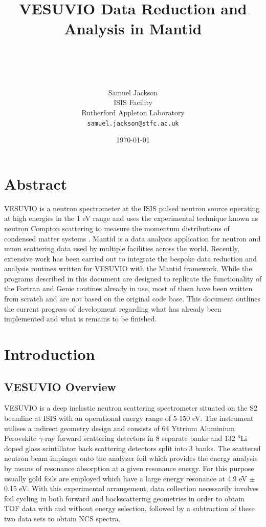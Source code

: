 \documentclass[paper=a4, fontsize=11pt]{scrartcl}	%
\title{ \vspace{-1in} 	\usefont{OT1}{bch}{b}{n}
		\huge \strut VESUVIO Data Reduction and Analysis in Mantid \strut \\
}
\author{ 									\usefont{OT1}{bch}{m}{n}
        Samuel Jackson\\		\usefont{OT1}{bch}{m}{n}
        ISIS Facility\\	\usefont{OT1}{bch}{m}{n}
        Rutherford Appleton Laboratory\\
        \texttt{samuel.jackson@stfc.ac.uk}
}
\date{\today}
\numberwithin{equation}{section}															%
\numberwithin{figure}{section}																%
\numberwithin{table}{section}
\begin{document}
\maketitle
\clearpage
\tableofcontents
\clearpage

\section{Abstract}
VESUVIO is a neutron spectrometer at the ISIS pulsed neutron source operating at high energies in the 1 eV range and uses the experimental technique known as neutron Compton scattering to measure the momentum distributions of condensed matter systems \citep{mayers2012vesuvio}. Mantid \citep{mantid} is a data analysis application for neutron and muon scattering data used by multiple facilities across the world. Recently, extensive work has been carried out to integrate the bespoke data reduction and analysis routines written for VESUVIO with the Mantid framework. While the programs described in this document are designed to replicate the functionality of the Fortran and Genie routines already in use, most of them have been written from scratch and are not based on the original code base. This document outlines the current progress of development regarding what has already been implemented and what is remains to be finished.

\clearpage
\section{Introduction}
\label{sec:introduction}
\subsection{VESUVIO Overview}
\label{subsec:VESUVIO-overview}
VESUVIO is a deep inelastic neutron scattering spectrometer situated on the S2 beamline at ISIS with an operational energy range of 5-150 eV. The instrument utilises a indirect geometry design and consists of 64 Yttrium Aluminium Perovskite $\gamma$-ray forward scattering detectors in 8 separate banks and 132 $^6$Li doped glass scintillator back scattering detectors split into 3 banks. The scattered neutron beam impinges onto the analyzer foil which provides the energy analysis by means of resonance absorption at a given resonance energy. For this purpose usually gold foils are employed which have a large energy resonance at 4.9 eV $\pm$ 0.15 eV. With this experimental arrangement, data collection necessarily involves foil cycling in both forward and backscattering geometries in order to obtain TOF data with and without energy selection, followed by a subtraction of these two data sets to obtain NCS spectra. 
\end{document}
